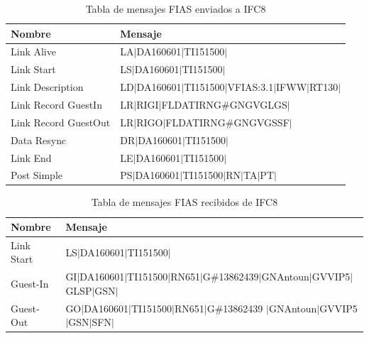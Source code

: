 \begin{table}[H]
\begin{tabular}{ p{6cm} p{10cm} }
\hline 
\bfseries \footnotesize {Nombre} & \bfseries \footnotesize {Mensaje} \\ 
\hline
\footnotesize {Link Alive} &\footnotesize  LA$\vert$DA160601$\vert$TI151500$\vert$
\\ \hline
\footnotesize {Link Start} &\footnotesize  LS$\vert$DA160601$\vert$TI151500$\vert$ \\ \hline
\footnotesize {Link Description} &\footnotesize LD$\vert$DA160601$\vert$TI151500$\vert$VFIAS:3.1$\vert$IFWW$\vert$RT130$\vert$\\ \hline
\footnotesize {Link Record GuestIn} &\footnotesize LR$\vert$RIGI$\vert$FLDATIRNG\#GNGVGLGS$\vert$
 \\ \hline
\footnotesize {Link Record GuestOut} &\footnotesize LR$\vert$RIGO$\vert$FLDATIRNG\#GNGVGSSF$\vert$\\  \hline  
\footnotesize {Data Resync} &\footnotesize DR$\vert$DA160601$\vert$TI151500$\vert$\\  \hline 
\footnotesize {Link End} &\footnotesize LE$\vert$DA160601$\vert$TI151500$\vert$\\  \hline 
\footnotesize {Post Simple} &\footnotesize PS$\vert$DA160601$\vert$TI151500$\vert$RN$\vert$TA$\vert$PT$\vert$\\  \hline 
\end{tabular}
\footnotesize \caption{Tabla de mensajes FIAS enviados a IFC8}
\label{table:ejFias}
\end{table}


\begin{table}[H]
\begin{tabular}{ p{3cm} p{13cm} }
\hline 
\bfseries \footnotesize {Nombre} & \bfseries \footnotesize {Mensaje} \\ 
\hline
\footnotesize {Link Start} &\footnotesize  LS$\vert$DA160601$\vert$TI151500$\vert$ \\ \hline
\footnotesize {Guest-In} &\footnotesize  GI$\vert$DA160601$\vert$TI151500$\vert$RN651$\vert$G\#13862439$\vert$GNAntoun$\vert$GVVIP5$\vert$GLSP$\vert$GSN$\vert$
\\ \hline
\footnotesize {Guest-Out} &\footnotesize  GO$\vert$DA160601$\vert$TI151500$\vert$RN651$\vert$G\#13862439
$\vert$GNAntoun$\vert$GVVIP5$\vert$GSN$\vert$SFN$\vert$
\\ \hline
\end{tabular}
\footnotesize \caption{Tabla de mensajes FIAS recibidos de IFC8}
\label{table:ejFiasRec}
\end{table}

